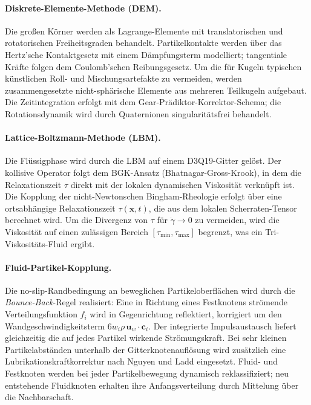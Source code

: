 \documentclass[a4paper,12pt]{article}
\begin{document}
\paragraph{Diskrete-Elemente-Methode (DEM).}
Die großen Körner werden als Lagrange-Elemente mit translatorischen und
rotatorischen Freiheitsgraden behandelt. Partikelkontakte werden über das
Hertz'sche Kontaktgesetz mit einem Dämpfungsterm modelliert; tangentiale
Kräfte folgen dem Coulomb'schen Reibungsgesetz. Um die für Kugeln typischen
künstlichen Roll- und Mischungsartefakte zu vermeiden, werden zusammengesetzte
nicht-sphärische Elemente aus mehreren Teilkugeln aufgebaut. Die Zeitintegration
erfolgt mit dem Gear-Prädiktor-Korrektor-Schema; die Rotationsdynamik wird
durch Quaternionen singularitätsfrei behandelt.

\paragraph{Lattice-Boltzmann-Methode (LBM).}
Die Flüssigphase wird durch die LBM auf einem D3Q19-Gitter gelöst. Der
kollisive Operator folgt dem BGK-Ansatz (Bhatnagar-Gross-Krook), in dem die
Relaxationszeit $\tau$ direkt mit der lokalen dynamischen Viskosität verknüpft
ist. Die Kopplung der nicht-Newtonschen Bingham-Rheologie erfolgt über eine
ortsabhängige Relaxationszeit $\tau(\mathbf{x}, t)$, die aus dem lokalen
Scherraten-Tensor berechnet wird. Um die Divergenz von $\tau$ für
$\dot{\gamma} \to 0$ zu vermeiden, wird die Viskosität auf einen zulässigen
Bereich $[\tau_\mathrm{min}, \tau_\mathrm{max}]$ begrenzt, was ein
Tri-Viskositäts-Fluid ergibt.

\paragraph{Fluid-Partikel-Kopplung.}
Die no-slip-Randbedingung an beweglichen Partikeloberflächen wird durch die
\emph{Bounce-Back}-Regel realisiert: Eine in Richtung eines Festknotens
strömende Verteilungsfunktion $f_i$ wird in Gegenrichtung reflektiert,
korrigiert um den Wandgeschwindigkeitsterm $6w_i\rho\,\mathbf{u}_w\cdot
\mathbf{c}_i$. Der integrierte Impulsaustausch liefert gleichzeitig die auf
jedes Partikel wirkende Strömungskraft. Bei sehr kleinen Partikelabständen
unterhalb der Gitterknotenauflösung wird zusätzlich eine Lubrikationskraftkorrektur nach Nguyen und Ladd eingesetzt. Fluid- und Festknoten werden bei
jeder Partikelbewegung dynamisch reklassifiziert; neu entstehende Fluidknoten
erhalten ihre Anfangsverteilung durch Mittelung über die Nachbarschaft.
\end{document}

